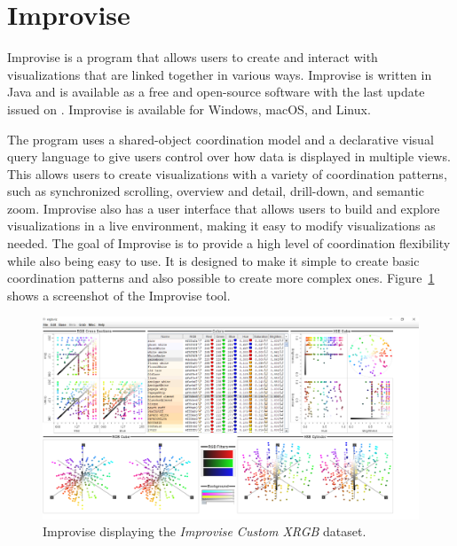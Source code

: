 \section{Improvise}

Improvise \parencite{Improvise} is a program that allows users to create
and interact with visualizations that are linked together in various ways.
Improvise is written in Java and is available as a free and open-source
software with the last update issued on .
Improvise is available for Windows, macOS, and Linux.

The program uses a shared-object coordination model and a declarative
visual query language to give users control over how data is displayed in
multiple views. This allows users to create visualizations with a variety
of coordination patterns, such as synchronized scrolling, overview and
detail, drill-down, and semantic zoom. Improvise also has a user interface
that allows users to build and explore visualizations in a live
environment, making it easy to modify visualizations as needed. The goal
of Improvise is to provide a high level of coordination flexibility while
also being easy to use. It is designed to make it simple to create basic
coordination patterns and also possible to create more complex ones.
Figure~\ref{fig:ScreenshotImprovise} shows a screenshot of the Improvise
tool.




\begin{figure}[tp]
\centering
\includegraphics[keepaspectratio,width=\linewidth,height=\halfh, frame]
{images/screenshot-improvise.png}

\caption[Improvise]
{%
Improvise displaying the \emph{Improvise Custom XRGB} dataset.
}
\label{fig:ScreenshotImprovise}
\end{figure}




